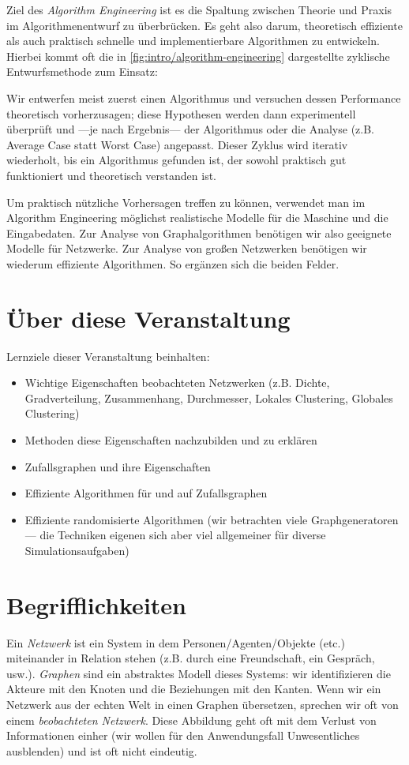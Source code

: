 Ziel des \emph{Algorithm Engineering} ist es die Spaltung zwischen Theorie und Praxis im Algorithmenentwurf zu überbrücken.
Es geht also darum, theoretisch effiziente als auch praktisch schnelle und implementierbare Algorithmen zu entwickeln.
Hierbei kommt oft die in \cref{fig:intro/algorithm-engineering} dargestellte zyklische Entwurfsmethode zum Einsatz:

Wir entwerfen meist zuerst einen Algorithmus und versuchen dessen Performance theoretisch vorherzusagen;
diese Hypothesen werden dann experimentell überprüft und ---je nach Ergebnis--- der Algorithmus oder die Analyse (z.B. Average Case statt Worst Case) angepasst.
Dieser Zyklus wird iterativ wiederholt, bis ein Algorithmus gefunden ist, der sowohl praktisch gut funktioniert und theoretisch verstanden ist.

Um praktisch nützliche Vorhersagen treffen zu können, verwendet man im Algorithm Engineering möglichst realistische Modelle für die Maschine und die Eingabedaten.
Zur Analyse von Graphalgorithmen benötigen wir also geeignete Modelle für Netzwerke.
Zur Analyse von großen Netzwerken benötigen wir wiederum effiziente Algorithmen.
So ergänzen sich die beiden Felder.

\section{Über diese Veranstaltung}
Lernziele dieser Veranstaltung beinhalten:
\begin{itemize}
    \item Wichtige Eigenschaften beobachteten Netzwerken (z.B. Dichte, Gradverteilung, Zusammenhang, Durchmesser, Lokales Clustering, Globales Clustering)
    \item Methoden diese Eigenschaften nachzubilden und zu erklären
    \item Zufallsgraphen und ihre Eigenschaften
    \item Effiziente Algorithmen für und auf Zufallsgraphen
    \item Effiziente randomisierte Algorithmen (wir betrachten viele Graphgeneratoren --- die Techniken eigenen sich aber viel allgemeiner für diverse Simulationsaufgaben)
\end{itemize}

\section{Begrifflichkeiten}
Ein \emph{Netzwerk} ist ein System in dem Personen/Agenten/Objekte (etc.) miteinander in Relation stehen (z.B. durch eine Freundschaft, ein Gespräch, usw.).
\emph{Graphen} sind ein abstraktes Modell dieses Systems: wir identifizieren die Akteure mit den Knoten und die Beziehungen mit den Kanten.
Wenn wir ein Netzwerk aus der echten Welt in einen Graphen übersetzen, sprechen wir oft von einem \emph{beobachteten Netzwerk}.
Diese Abbildung geht oft mit dem Verlust von Informationen einher (wir wollen für den Anwendungsfall Unwesentliches ausblenden) und ist oft nicht eindeutig.

